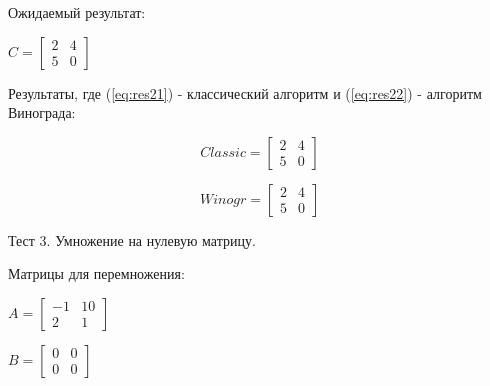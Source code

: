 \documentclass[12pt,a4paper]{scrartcl}
\begin{document}
	Ожидаемый результат:
	
	\begin{center}
		\begin{math}\label{eq:res2}
		C =\begin{bmatrix}
		2 & 4 \\
		5 & 0
		\end{bmatrix}
		\end{math}
	\end{center}
	
	Результаты, где (\ref{eq:res21}) - классический алгоритм и (\ref{eq:res22}) - алгоритм Винограда:
	
	\begin{center}
		\begin{minipage}[c][3cm][c]{0,3\textwidth}
			\begin{equation}\label{eq:res21}
			Classic =\begin{bmatrix}
			2 & 4 \\ 
			5 & 0
			\end{bmatrix}
			\end{equation}
		\end{minipage}	
		\begin{minipage}[c][3cm][c]{0,3\textwidth}
			\begin{equation}\label{eq:res22}
			Winogr =\begin{bmatrix}
			2 & 4 \\
			5 & 0
			\end{bmatrix}
			\end{equation}
		\end{minipage}
	\end{center}
	
	
	Тест 3. Умножение на нулевую матрицу.
	
	Матрицы для перемножения:
	
	\begin{minipage}[c][3cm][c]{0,5\textwidth}
		\begin{math}\label{eq:test31}
		A =\begin{bmatrix}
		-1 & 10 \\
		2 & 1
		\end{bmatrix}
		\end{math}
	\end{minipage}
	\begin{minipage}[c][3cm][c]{0,5\textwidth}
		\begin{math}\label{eq:test32}
		B =\begin{bmatrix}
		0 & 0 \\
		0 & 0 
		\end{bmatrix}
		\end{math}
	\end{minipage}
	
\end{document}
